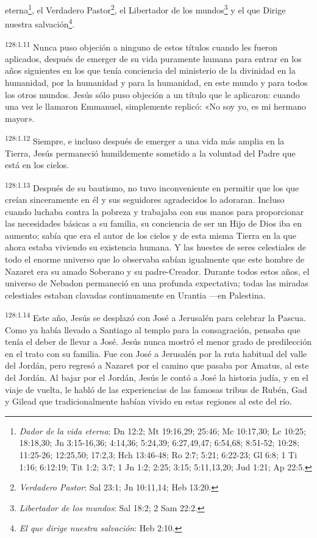 eterna\footnote{\textit{Dador de la vida eterna}: Dn 12:2; Mt 19:16,29; 25:46; Mc 10:17,30; Lc 10:25; 18:18,30; Jn 3:15-16,36; 4:14,36; 5:24,39; 6:27,49,47; 6:54,68; 8:51-52; 10:28; 11:25-26; 12:25,50; 17:2,3; Hch 13:46-48; Ro 2:7; 5:21; 6:22-23; Gl 6:8; 1 Ti 1:16; 6:12:19; Tit 1:2; 3:7; 1 Jn 1:2; 2:25; 3:15; 5:11,13,20; Jud 1:21; Ap 22:5.}, el Verdadero Pastor\footnote{\textit{Verdadero Pastor}: Sal 23:1; Jn 10:11,14; Heb 13:20.}, el Libertador de los mundos\footnote{\textit{Libertador de los mundos}: Sal 18:2; 2 Sam 22:2.} y el que Dirige nuestra salvación\footnote{\textit{El que dirige nuestra salvación}: Heb 2:10.}.

\par 
\textsuperscript{128:1.11} Nunca puso objeción a ninguno de estos títulos cuando les fueron aplicados, después de emerger de su vida puramente humana para entrar en los años siguientes en los que tenía conciencia del ministerio de la divinidad en la humanidad, por la humanidad y para la humanidad, en este mundo y para todos los otros mundos. Jesús sólo puso objeción a un título que le aplicaron: cuando una vez le llamaron Emmanuel, simplemente replicó: «No soy yo, es mi hermano mayor».

\par 
\textsuperscript{128:1.12} Siempre, e incluso después de emerger a una vida más amplia en la Tierra, Jesús permaneció humildemente sometido a la voluntad del Padre que está en los cielos.

\par 
\textsuperscript{128:1.13} Después de su bautismo, no tuvo inconveniente en permitir que los que creían sinceramente en él y sus seguidores agradecidos lo adoraran. Incluso cuando luchaba contra la pobreza y trabajaba con sus manos para proporcionar las necesidades básicas a su familia, su conciencia de ser un Hijo de Dios iba en aumento; sabía que era el autor de los cielos y de esta misma Tierra en la que ahora estaba viviendo su existencia humana. Y las huestes de seres celestiales de todo el enorme universo que lo observaba sabían igualmente que este hombre de Nazaret era su amado Soberano y su padre-Creador. Durante todos estos años, el universo de Nebadon permaneció en una profunda expectativa; todas las miradas celestiales estaban clavadas continuamente en Urantia ---en Palestina.

\par 
\textsuperscript{128:1.14} Este año, Jesús se desplazó con José a Jerusalén para celebrar la Pascua. Como ya había llevado a Santiago al templo para la consagración, pensaba que tenía el deber de llevar a José. Jesús nunca mostró el menor grado de predilección en el trato con su familia. Fue con José a Jerusalén por la ruta habitual del valle del Jordán, pero regresó a Nazaret por el camino que pasaba por Amatus, al este del Jordán. Al bajar por el Jordán, Jesús le contó a José la historia judía, y en el viaje de vuelta, le habló de las experiencias de las famosas tribus de Rubén, Gad y Gilead que tradicionalmente habían vivido en estas regiones al este del río.

